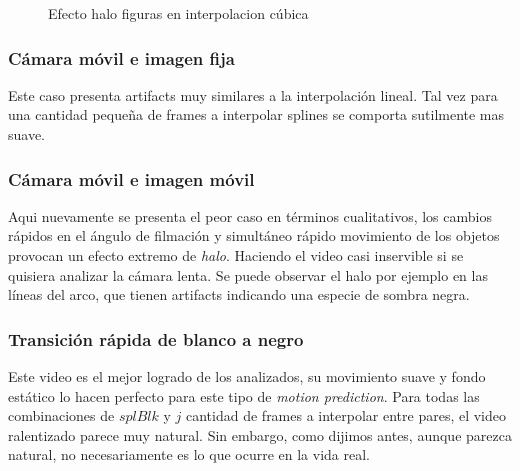 \begin{figure}[H]
    \centering
    \caption{Efecto halo figuras en interpolacion cúbica}
    \label{fig:artifact}
\end{figure}

\subsubsection*{Cámara móvil e imagen fija}
Este caso presenta artifacts muy similares a la interpolación lineal. Tal vez para una cantidad pequeña de frames a interpolar splines se comporta sutilmente mas suave.

\subsubsection*{Cámara móvil e imagen móvil}
Aqui nuevamente se presenta el peor caso en términos cualitativos, los cambios rápidos en el ángulo de filmación y simultáneo rápido movimiento de los objetos provocan un efecto extremo de \emph{halo}. Haciendo el video casi inservible si se quisiera analizar la cámara lenta. Se puede observar el halo por ejemplo en las líneas del arco, que tienen artifacts indicando una especie de sombra negra. 

\subsubsection*{Transición rápida de blanco a negro}
Este video es el mejor logrado de los analizados, su movimiento suave y fondo estático lo hacen perfecto para este tipo de \emph{motion prediction}. Para todas las combinaciones de $splBlk$ y $j$ cantidad de frames a interpolar entre pares, el video ralentizado parece muy natural. Sin embargo, como dijimos antes, aunque parezca natural, no necesariamente es lo que ocurre en la vida real.

